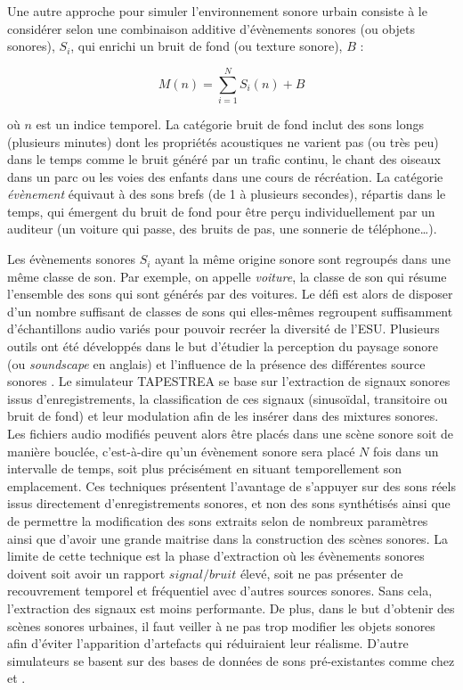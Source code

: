 Une autre approche pour simuler l'environnement sonore urbain consiste à le considérer selon une combinaison additive d'évènements sonores (ou objets sonores), $S_i$, qui enrichi un bruit de fond (ou texture  sonore), $B$ \cite{nelken2013ear} :

\begin{equation}
M(n) = \sum_{i = 1}^{N} S_i(n) + B
\end{equation}

où $n$ est un indice temporel.
La catégorie bruit de fond inclut des sons longs (plusieurs minutes) dont les propriétés acoustiques ne varient pas (ou très peu) dans le temps comme le bruit généré par un trafic continu, le chant des oiseaux dans un parc ou les voies des enfants dans une cours de récréation.
La catégorie \textit{évènement} équivaut à des sons brefs (de 1 à plusieurs secondes), répartis dans le temps, qui émergent du bruit de fond pour être perçu individuellement par un auditeur (un voiture qui passe, des bruits de pas, une sonnerie de téléphone\dots). 

Les évènements sonores $S_i$ ayant la même origine sonore sont regroupés dans une même classe de son. Par exemple, on appelle \textit{voiture}, la classe de son qui résume l'ensemble des sons qui sont générés par des voitures. 
Le défi est alors de disposer d'un nombre suffisant de classes de sons qui elles-mêmes regroupent suffisamment d'échantillons audio variés pour pouvoir recréer la diversité de l'ESU. Plusieurs outils ont été développés dans le but d'étudier la perception du paysage sonore (ou \textit{soundscape} en anglais) et l'influence de la présence des différentes source sonores \cite{valle2009framework, finney2010soundscape}. Le simulateur TAPESTREA \cite{misra_musical_2007} se base sur l'extraction de signaux sonores issus d'enregistrements, la classification de ces signaux (sinusoïdal, transitoire ou bruit de fond) et leur modulation afin de les insérer dans des mixtures sonores. Les fichiers audio modifiés peuvent alors être placés dans une scène sonore soit de manière bouclée, c'est-à-dire qu'un évènement sonore sera placé $N$ fois dans un intervalle de temps, soit plus précisément en situant temporellement son emplacement.
Ces techniques présentent l'avantage de s'appuyer sur des sons réels issus directement d'enregistrements sonores, et non des sons synthétisés ainsi que de permettre la modification des sons extraits selon de nombreux paramètres ainsi que d'avoir une grande maitrise dans la construction des scènes sonores. La limite de cette technique est la phase d'extraction où les évènements sonores doivent soit avoir un rapport $signal/bruit$ élevé, soit ne pas présenter de recouvrement temporel et fréquentiel avec d'autres sources sonores. Sans cela, l'extraction des signaux est moins performante. De plus, dans le but d'obtenir des scènes sonores urbaines, il faut veiller à ne pas trop modifier les objets sonores afin d'éviter l'apparition d'artefacts qui réduiraient leur réalisme.
D'autre simulateurs se basent sur des bases de données de sons pré-existantes comme chez \cite{bruce_development_2009} et \cite{rossignol_simscene_2015}.

